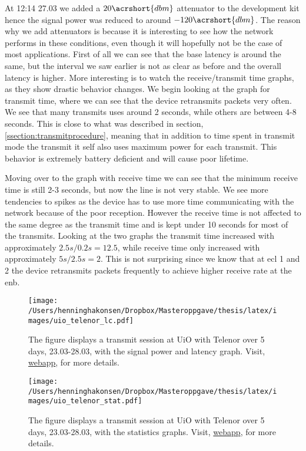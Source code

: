\documentclass[USenglish]{ifimaster}  %
\begin{document}
At 12:14 27.03 we added a ${20 \acrshort{dbm}}$ attenuator to the development kit hence the signal power was reduced to around ${-120 \acrshort{dbm}}$. The reason why we add attenuators is because it is interesting to see how the network performs in these conditions, even though it will hopefully not be the case of most applications. First of all we can see that the base latency is around the same, but the interval we saw earlier is not as clear as before and the overall latency is higher. More interesting is to watch the receive/transmit time graphs, as they show drastic behavior changes. We begin looking at the graph for transmit time, where we can see that the device retransmits packets very often. We see that many transmits uses around 2 seconds, while others are between 4-8 seconds. This is close to what was described in section, \vref{ssection:transmitprocedure}, meaning that in addition to time spent in transmit mode the transmit it self also uses maximum power for each transmit. This behavior is extremely battery deficient and will cause poor lifetime.

Moving over to the graph with receive time we can see that the minimum receive time is still 2-3 seconds, but now the line is not very stable. We see more tendencies to spikes as the device has to use more time communicating with the network because of the poor reception. However the receive time is not affected to the same degree as the transmit time and is kept under 10 seconds for most of the transmits. Looking at the two graphs the transmit time increased with approximately ${2.5s / 0.2s = 12.5}$, while receive time only increased with approximately ${5s / 2.5s = 2}$. This is not surprising since we know that at \acrshort{ecl} 1 and 2 the device retransmits packets frequently to achieve higher receive rate at the \acrshort{enb}.

\begin{figure}[H]
  \centering
  \texttt{[image: /Users/henninghakonsen/Dropbox/Masteroppgave/thesis/latex/images/uio\_telenor\_lc.pdf]}
  \caption[Long-term test - Telenor 23.03-28.03, signal power and latency]{The figure displays a transmit session at UiO with Telenor over 5 days, 23.03-28.03, with the signal power and latency graph. Visit, \href{http://158.39.77.97:9000/\#/nodes/id2}{webapp}, for more details.}
  \label{figure:uio_telenor_lc}
\end{figure}

\begin{figure}[H]
  \centering
  \texttt{[image: /Users/henninghakonsen/Dropbox/Masteroppgave/thesis/latex/images/uio\_telenor\_stat.pdf]}
  \caption[Long-term test - Telenor 23.03-28.03, statistics]{The figure displays a transmit session at UiO with Telenor over 5 days, 23.03-28.03, with the statistics graphs. Visit, \href{http://158.39.77.97:9000/\#/nodes/id2}{webapp}, for more details.}
  \label{figure:uio_telenor_stat}
\end{figure}
\end{document}
